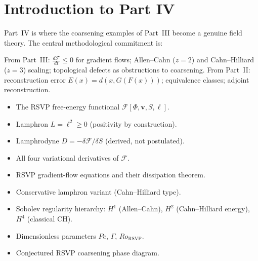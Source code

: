 
\chapter*{Introduction to Part IV}

Part~IV is where the coarsening examples of Part~III become
a genuine field theory.
The central methodological commitment is:


\begin{tcolorbox}[title={\textbf{Established So Far}},
  colback=boxgreen,colframe=green!50!black,fonttitle=\small\sffamily]
From Part~III: $\frac{d\mathcal{F}}{dt} \leq 0$ for gradient flows;
Allen--Cahn ($z=2$) and Cahn--Hilliard ($z=3$) scaling;
topological defects as obstructions to coarsening.
From Part~II: reconstruction error $E(x) = d(x, G(F(x)))$;
equivalence classes; adjoint reconstruction.
\end{tcolorbox}

\bigskip

\begin{tcolorbox}[title={\textbf{New Ideas in This Part}},
  colback=boxblue,colframe=blue!40!black,fonttitle=\small\sffamily]
\begin{itemize}[leftmargin=1.5em,itemsep=2pt]
  \item The RSVP free-energy functional
    $\mathcal{F}[\Phi,\mathbf{v},S,\ell]$.
  \item Lamphron $L = \ell^2 \geq 0$ (positivity by construction).
  \item Lamphrodyne $D = -\delta\mathcal{F}/\delta S$
    (derived, not postulated).
  \item All four variational derivatives of $\mathcal{F}$.
  \item RSVP gradient-flow equations and their dissipation theorem.
  \item Conservative lamphron variant (Cahn--Hilliard type).
  \item Sobolev regularity hierarchy: $H^1$ (Allen--Cahn),
    $H^2$ (Cahn--Hilliard energy), $H^4$ (classical CH).
  \item Dimensionless parameters $Pe$, $\Gamma$, $Ro_{\mathrm{RSVP}}$.
  \item Conjectured RSVP coarsening phase diagram.
\end{itemize}
\end{tcolorbox}

